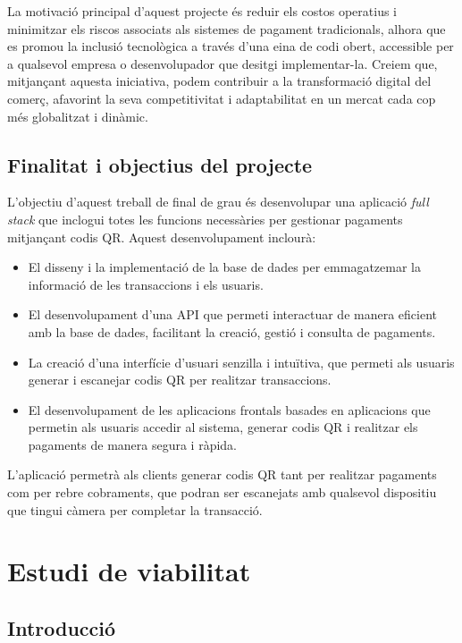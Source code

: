 \documentclass[a4paper,12pt,twoside]{ThesisStyle}
\begin{document}
La motivació principal d'aquest projecte és reduir els costos operatius i minimitzar els riscos associats als sistemes de pagament tradicionals, alhora que es promou la inclusió tecnològica a través d'una eina de codi obert, accessible per a qualsevol empresa o desenvolupador que desitgi implementar-la. Creiem que, mitjançant aquesta iniciativa, podem contribuir a la transformació digital del comerç, afavorint la seva competitivitat i adaptabilitat en un mercat cada cop més globalitzat i dinàmic.

\section{Finalitat i objectius del projecte}
\label{sec:Finalitat i objectius del projecte}

L'objectiu d'aquest treball de final de grau és desenvolupar una aplicació \textit{full stack} que inclogui totes les funcions necessàries per gestionar pagaments mitjançant codis QR. Aquest desenvolupament inclourà:

\begin{itemize}
  \item El disseny i la implementació de la base de dades per emmagatzemar la informació de les transaccions i els usuaris.
  \item El desenvolupament d'una API que permeti interactuar de manera eficient amb la base de dades, facilitant la creació, gestió i consulta de pagaments.
  \item La creació d'una interfície d'usuari senzilla i intuïtiva, que permeti als usuaris generar i escanejar codis QR per realitzar transaccions.
  \item El desenvolupament de les aplicacions frontals basades en aplicacions que permetin als usuaris accedir al sistema, generar codis QR i realitzar els pagaments de manera segura i ràpida.
\end{itemize}

L'aplicació permetrà als clients generar codis QR tant per realitzar pagaments com per rebre cobraments, que podran ser escanejats amb qualsevol dispositiu que tingui càmera per completar la transacció.


\chapter{Estudi de viabilitat}
\label{chp:viabilitats}

\section{Introducció}
\label{subsec: Introducció}
\end{document}
